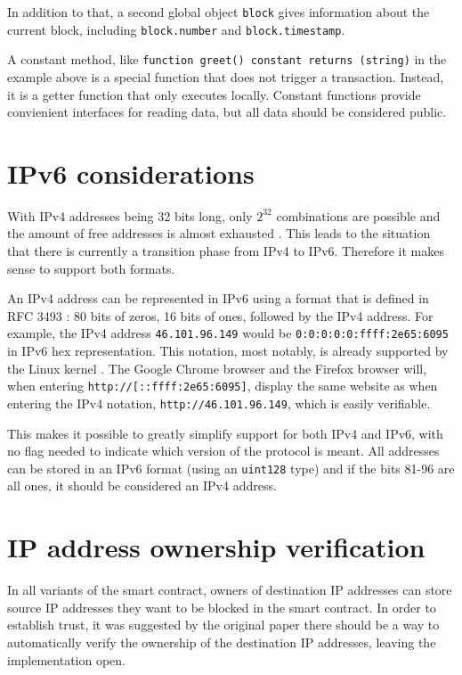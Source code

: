 In addition to that, a second global object \texttt{block} gives information about the current block, including \texttt{block.number} and \texttt{block.timestamp}.

A constant method, like \texttt{function greet() constant returns (string)} in the example above is a special function that does not trigger a transaction. Instead, it is a getter function that only executes locally. Constant functions provide convienient interfaces for reading data, but all data should be considered public.

\section{IPv6 considerations}

With IPv4 addresses being 32 bits long, only $ 2^{32} $ combinations are possible and the amount of free addresses is almost exhausted \cite{IPv4Exhaustion}. This leads to the situation that there is currently a transition phase from IPv4 to IPv6. Therefore it makes sense to support both formats.

An IPv4 address can be represented in IPv6 using a format that is defined in RFC 3493 \cite{RFC3493}: 80 bits of zeros, 16 bits of ones, followed by the IPv4 address. For example, the IPv4 address \texttt{46.101.96.149} would be \texttt{0:0:0:0:0:ffff:2e65:6095} in IPv6 hex representation. This notation, most notably, is already supported by the Linux kernel \cite{IPv6Wiki16}. The Google Chrome browser and the Firefox browser will, when entering \texttt{http://[::ffff:2e65:6095]}, display the same website as when entering the IPv4 notation, \texttt{http://46.101.96.149}, which is easily verifiable.

This makes it possible to greatly simplify support for both IPv4 and IPv6, with no flag needed to indicate which version of the protocol is meant. All addresses can be stored in an IPv6 format (using an \texttt{uint128} type) and if the bits 81-96 are all ones, it should be considered an IPv4 address.







\section{IP address ownership verification}

In all variants of the smart contract, owners of destination IP addresses can store source IP addresses they want to be blocked in the smart contract. In order to establish trust, it was suggested by the original paper \cite{OriginalPaper} there should be a way to automatically verify the ownership of the destination IP addresses, leaving the implementation open.

